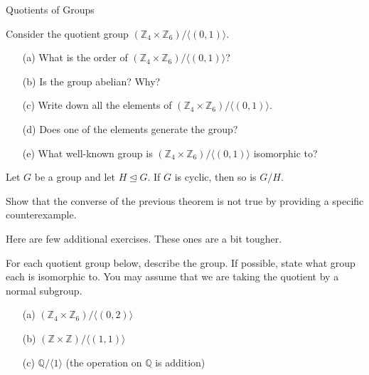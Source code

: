 \begin{section}{Quotients of Groups}
\begin{exercise}
Consider the quotient group \((\mathbb{Z}_4\times \mathbb{Z}_6)/\langle (0,1)\rangle\).
\begin{enumerate}
\item[(a)] What is the order of \((\mathbb{Z}_4\times \mathbb{Z}_6)/\langle (0,1)\rangle\)?
\item[(b)] Is the group abelian?  Why?
\item[(c)] Write down all the elements of \((\mathbb{Z}_4\times \mathbb{Z}_6)/\langle (0,1)\rangle\).
\item[(d)] Does one of the elements generate the group?
\item[(e)] What well-known group is \((\mathbb{Z}_4\times \mathbb{Z}_6)/\langle (0,1)\rangle\) isomorphic to?
\end{enumerate}
\end{exercise}

\begin{theorem}
Let \(G\) be a group and let \(H\trianglelefteq G\).  If \(G\) is cyclic, then so is \(G/H\).
\end{theorem}

\begin{problem}
Show that the converse of the previous theorem is not true by providing a specific counterexample.
\end{problem}

Here are few additional exercises.  These ones are a bit tougher.

\begin{exercise}
For each quotient group below, describe the group.  If possible, state what group each is isomorphic to.  You may assume that we are taking the quotient by a normal subgroup. 
\begin{enumerate}
\item[(a)] \((\mathbb{Z}_4\times \mathbb{Z}_6)/\langle (0,2)\rangle\)
\item[(b)] \((\mathbb{Z}\times \mathbb{Z})/\langle (1,1)\rangle\)
\item[(c)] \(\mathbb{Q}/\langle 1\rangle\) (the operation on \(\mathbb{Q}\) is addition)
\end{enumerate}
\end{exercise}

\end{section}
